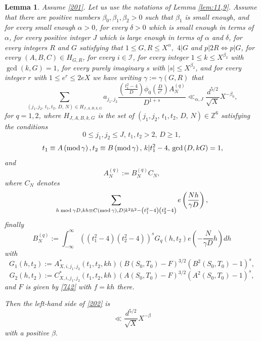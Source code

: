\documentclass[12pt]{amsart}
\newtheorem{lemma}[theorem]{Lemma}
\theoremstyle{definition}
\numberwithin{equation}{section}
\begin{document}
\begin{lemma}\label{lem:11,94}Assume \eqref{201}. Let us use
the notations of Lemma \ref{lem:11,9}. Assume that there are positive numbers $
\beta_0,\beta_1,\beta_2>0$ such
that $\beta_1$ is small enough, and for every small enough $\alpha
>0$, for every $\delta >0$ which is small enough in terms of
$\alpha$, for every positive integer $J$ which is large enough
in terms of $\alpha$ and $\delta$, for every integers $R$ and $G$ satisfying that
$1\le G,R\le X^{\alpha},$ $4|G$ and $p|2R\Leftrightarrow p|G$, for every
$\left(A,B,C\right)\in H_{G,R}$, for every $i\in\mathcal I$, for every
integer $1\le k\le X^{\beta_2}$ with $\gcd\left(k,G\right)=1$, for every purely
imaginary $s$ with $|s|\le X^{\beta_2}$, and for every integer $r$ with
$1\le e^r\le 2eX$ we have writing $\gamma :=\gamma\left(G,R\right
)$ that
\begin{equation}\sum_{\left(j_1,j_2,\,t_1,t_2,\,D,\,N\right)\in H_{
J,A,B,k,G}}a_{j_1,j_2}\frac {\left(\frac {t_1^2-4}D\right)\phi_0\left
(\frac D{e^r}\right)A_N^{(q)}}{D^{1+s}}\ll_{\alpha ,J}\frac {d^{5
/2}}{\sqrt {X}}X^{-\beta_0},\label{911}\end{equation}
for $q=1,2$, where $H_{J,A,B,k,G}$ is the set of
$\left(j_1,j_2,\,t_1,t_2,\,D,\,N\right)\in\mathbb{Z}^6$ satisfying the conditions
\begin{equation}0\le j_1,j_2\le J,\,t_1,t_2>2,\,D\ge 1,\label{912}\end{equation}
\begin{equation}\,t_1\equiv A\left({\rm m}{\rm o}{\rm d}\,\gamma\right
),t_2\equiv B\left({\rm m}{\rm o}{\rm d}\,\gamma\right),\,k|t_1^2
-4,\,\gcd\left(D,kG\right)=1,\label{913}\end{equation}
and
\[A_N^{(q)}:=B_N^{(q)}C_N,\]
where $C_N$ denotes
\[\sum_{h\:{\rm m}{\rm o}{\rm d}\:\gamma D,kh\equiv C\left({\rm m}
{\rm o}{\rm d}\,\gamma\right),D|k^2h^2-\left(t_1^2-4\right)\left(
t_2^2-4\right)}e\left(\frac {Nh}{\gamma D}\right),\]
finally
\[B_N^{(q)}:=\int_{-\infty}^{\infty}\left(\left(t_1^2-4\right)\left
(t_2^2-4\right)\right)^sG_q\left(h,t_2\right)e\left(-\frac N{\gamma
D}h\right)dh\]
with
\begin{equation}G_1\left(h,t_2\right):=A_{X,i,j_1,j_2}^{\ast}\left
(t_1,t_2,kh\right)\left(B\left(S_0,T_0\right)-F\right)^{3/2}\left
(B^2\left(S_0,T_0\right)-1\right)^s,\label{913,1}\end{equation}
\begin{equation}G_2\left(h,t_2\right):=C_{X,i,j_1,j_2}^{\ast}\left
(t_1,t_2,kh\right)\left(A\left(S_0,T_0\right)-F\right)^{3/2}\left
(A^2\left(S_0,T_0\right)-1\right)^s,\label{913,2}\end{equation}
and $F$ is given by \eqref{742} with  $f=kh$ there.

Then the left-hand side of \eqref{202} is
\[\ll\frac {d^{5/2}}{\sqrt {X}}X^{-\beta}\]
with a positive $\beta .$
\end{lemma}
\end{document}
